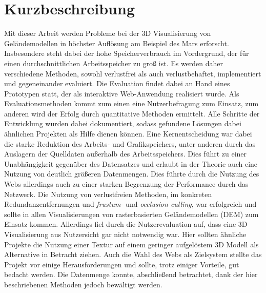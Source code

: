 \chapter{Kurzbeschreibung}
Mit dieser Arbeit werden Probleme bei der 3D Visualisierung von Geländemodellen in höchster Auflösung am Beispiel des Mars erforscht. Insbesondere steht dabei
der hohe Speicherverbrauch im Vordergrund, der für einen durchschnittlichen Arbeitsspeicher zu groß ist. Es werden daher verschiedene Methoden, sowohl verlustfrei als auch
verlustbehaftet, implementiert und gegeneinander evaluiert. Die Evaluation findet dabei an Hand eines Prototypen statt, der als interaktive Web-Anwendung realisiert wurde. Als Evaluationsmethoden kommt zum einen eine Nutzerbefragung zum Einsatz, zum anderen wird der Erfolg durch quantitative Methoden ermittelt. Alle Schritte der Entwicklung wurden dabei dokumentiert, sodass gefundene Lösungen dabei ähnlichen Projekten als Hilfe dienen können. Eine Kernentscheidung war dabei die starke Reduktion des Arbeits- und Grafikspeichers, unter anderen durch das Auslagern der Quelldaten außerhalb des Arbeitsspeichers. Dies führt zu einer Unabhängigkeit gegenüber des Datensatzes und erlaubt in der Theorie auch eine Nutzung von deutlich größeren Datenmengen. Dies führte durch die Nutzung des Webs allerdings auch zu einer starken Begrenzung der Performance durch das Netzwerk. Die Nutzung von verlustfreien Methoden, im konkreten Redundanzentfernungen und \textit{frustum-} und \textit{occlusion culling}, war erfolgreich und sollte in allen Visualisierungen von rasterbasierten Geländemodellen (DEM) zum Einsatz  kommen. Allerdings fiel durch die Nutzerevaluation auf, dass eine 3D Visualisierung aus Nutzersicht gar nicht notwendig war. Hier sollten ähnliche Projekte die Nutzung einer Textur auf einem geringer aufgelöstem 3D Modell als Alternative in Betracht ziehen. Auch die Wahl des Webs als Zielsystem stellte das Projekt vor einige Herausforderungen und sollte, trotz einiger Vorteile, gut bedacht werden. Die Datenmenge konnte, abschließend betrachtet, dank der hier beschriebenen Methoden jedoch bewältigt werden.
